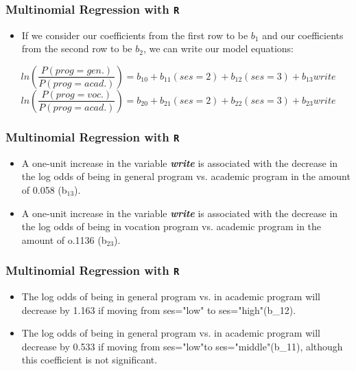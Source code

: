 \documentclass[00-GLMregslides.tex]{subfiles}
\begin{document}
\begin{frame}[fragile]
\frametitle{Multinomial Regression with \texttt{R}}
\Large
\begin{itemize}
\item If we consider our coefficients from the first row to be $b_1$ and our coefficients from the second row to be $b_2$, we can write our model equations:
\end{itemize}
{\normalsize
	
	\hspace{-0.95cm} \[ ln\left(\frac{P(prog=gen.)}{P(prog=acad.)}\right) = b_{10} + b_{11}(ses=2) + b_{12}(ses=3) + b_{13}write \] \[ ln\left(\frac{P(prog=voc.)}{P(prog=acad.)}\right) = b_{20} + b_{21}(ses=2) + b_{22}(ses=3) + b_{23}write \] 
}

\end{frame}
\begin{frame}[fragile]
	
	\frametitle{Multinomial Regression with \texttt{R}}
	\Large
	\begin{itemize}

\item A one-unit increase in the variable \textbf{\textit{write}} is associated with the decrease in the log odds of being in general program vs. academic program in the amount of 0.058 (b$_{13}$).
\item A one-unit increase in the variable \textbf{\textit{write}} is associated with the decrease in the log odds of being in vocation program vs. academic program in the amount of o.1136 (b$_{23}$).
\end{itemize}
\end{frame}
\begin{frame}[fragile]

\frametitle{Multinomial Regression with \texttt{R}}
\Large
\begin{itemize}
\item The log odds of being in general program vs. in academic program will decrease by 1.163 if moving from ses="low" to ses="high"(b\_12).
\item The log odds of being in general program vs. in academic program will decrease by 0.533 if moving from ses="low"to ses="middle"(b\_11), although this coefficient is not significant.
\end{itemize}
\end{frame}
\end{document}
